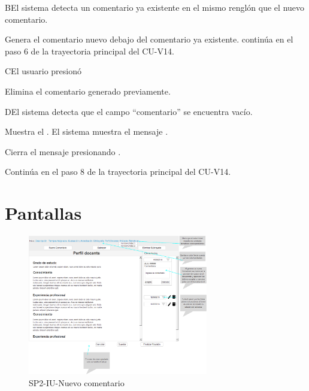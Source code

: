 \label{SP2-CU14-B}
\begin{UCtrayectoriaA}{B}{El sistema detecta un comentario ya existente en el mismo renglón que el nuevo comentario.}

    \UCpaso Genera el comentario nuevo debajo del comentario ya existente. 
    \UCpaso continúa en el paso 6 de la trayectoria principal del CU-V14.
\end{UCtrayectoriaA}

\label{SP2-CU14-C}
\begin{UCtrayectoriaA}{C}{El usuario presionó }

	\UCpaso Elimina el comentario generado previamente.
\end{UCtrayectoriaA}

\label{SP2-CU14-D}
\begin{UCtrayectoriaA}{D}{El sistema detecta que el campo “comentario” se encuentra vacío.} 

	\UCpaso Muestra el .
    \UCpaso El sistema muestra el mensaje .

    \UCpaso[\UCactor] Cierra el mensaje presionando .

    \UCpaso Continúa en el paso 8 de la trayectoria principal del CU-V14.
\end{UCtrayectoriaA}

\chapter{Pantallas}
 \begin{figure}
  \centering
    \includegraphics[width=0.7\textwidth]{DCU/SP2/Pantallas/Nuevo_comentario}
  \caption{SP2-IU-Nuevo comentario}
  \label{SP2-IU-Nuevo_comentario}
\end{figure}
